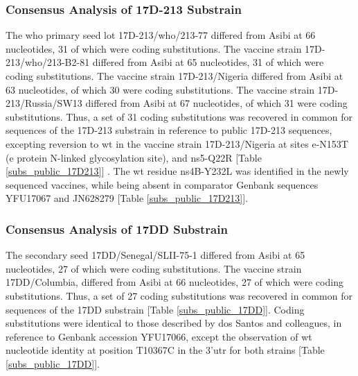 	\subsubsection{Consensus Analysis of 17D-213 Substrain}
The \gls{who} primary seed lot 17D-213/\gls{who}/213-77 differed from Asibi at 66 nucleotides, 31 of which were coding substitutions. The vaccine strain 17D-213/\gls{who}/213-B2-81 differed from Asibi at 65 nucleotides, 31 of which were coding substitutions. The vaccine strain 17D-213/Nigeria differed from Asibi at 63 nucleotides, of which 30 were coding substitutions. The vaccine strain 17D-213/Russia/SW13 differed from Asibi at 67 nucleotides, of which 31 were coding substitutions. Thus, a set of 31 coding substitutions was recovered in common for sequences of the 17D-213 substrain in reference to public 17D-213 sequences, excepting reversion to \gls{wt} in the vaccine strain 17D-213/Nigeria at sites \gls{e}-N153T (\gls{e} protein N-linked glycosylation site), and \gls{ns}5-Q22R [Table \ref{subs_public_17D213}] \parencite{dosSantos:1995wq}. The \gls{wt} residue \gls{ns}4B-Y232L was identified in the newly sequenced vaccines, while being absent in comparator Genbank sequences YFU17067 and JN628279 [Table \ref{subs_public_17D213}].
	\subsubsection{Consensus Analysis of 17DD Substrain}
The secondary seed 17DD/Senegal/SLII-75-1 differed from Asibi at 65 nucleotides, 27 of which were coding substitutions. The vaccine strain 17DD/Columbia, differed from Asibi at 66 nucleotides, 27 of which were coding substitutions. Thus, a set of 27 coding substitutions was recovered in common for sequences of the 17DD substrain [Table \ref{subs_public_17DD}]. Coding substitutions were identical to those described by dos Santos and colleagues, in reference to Genbank accession YFU17066, except the observation of \gls{wt} nucleotide identity at position T10367C in the 3’\gls{utr} for both strains \parencite{dosSantos:1995wq} [Table \ref{subs_public_17DD}].
